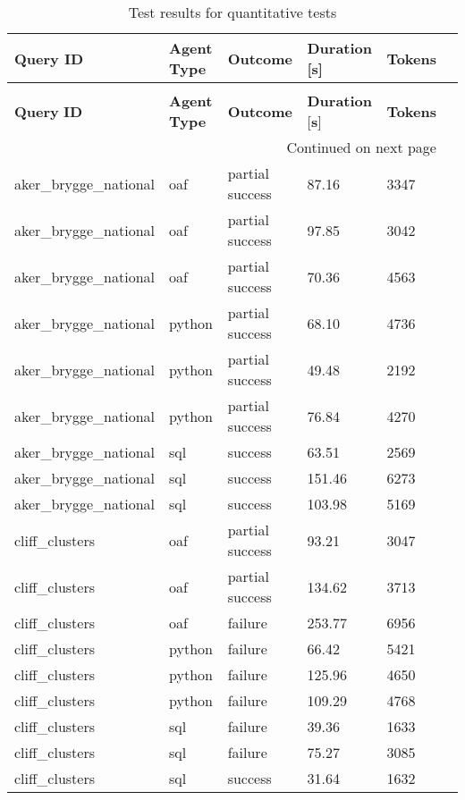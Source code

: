 \begin{longtable}{lp{1.8cm}p{1.8cm}p{1.8cm}p{1.8cm}p{1.8cm}}
\caption{Test results for quantitative tests} \label{tbl:test-results-quantitative} \\
\toprule
\textbf{Query} \textbf{ID} & \textbf{Agent} \textbf{Type} & \textbf{Outcome} & \textbf{Duration} [\textbf{s}] & \textbf{Tokens} \\
\midrule
\endfirsthead
\caption[]{Test results for quantitative tests} \\
\toprule
\textbf{Query} \textbf{ID} & \textbf{Agent} \textbf{Type} & \textbf{Outcome} & \textbf{Duration} [\textbf{s}] & \textbf{Tokens} \\
\midrule
\endhead
\midrule
\multicolumn{5}{r}{Continued on next page} \\
\midrule
\endfoot
\bottomrule
\endlastfoot
aker\_brygge\_national & oaf & partial success & 87.16 & 3347 \\
aker\_brygge\_national & oaf & partial success & 97.85 & 3042 \\
aker\_brygge\_national & oaf & partial success & 70.36 & 4563 \\
aker\_brygge\_national & python & partial success & 68.10 & 4736 \\
aker\_brygge\_national & python & partial success & 49.48 & 2192 \\
aker\_brygge\_national & python & partial success & 76.84 & 4270 \\
aker\_brygge\_national & sql & success & 63.51 & 2569 \\
aker\_brygge\_national & sql & success & 151.46 & 6273 \\
aker\_brygge\_national & sql & success & 103.98 & 5169 \\
cliff\_clusters & oaf & partial success & 93.21 & 3047 \\
cliff\_clusters & oaf & partial success & 134.62 & 3713 \\
cliff\_clusters & oaf & failure & 253.77 & 6956 \\
cliff\_clusters & python & failure & 66.42 & 5421 \\
cliff\_clusters & python & failure & 125.96 & 4650 \\
cliff\_clusters & python & failure & 109.29 & 4768 \\
cliff\_clusters & sql & failure & 39.36 & 1633 \\
cliff\_clusters & sql & failure & 75.27 & 3085 \\
cliff\_clusters & sql & success & 31.64 & 1632 \\

\end{longtable}
